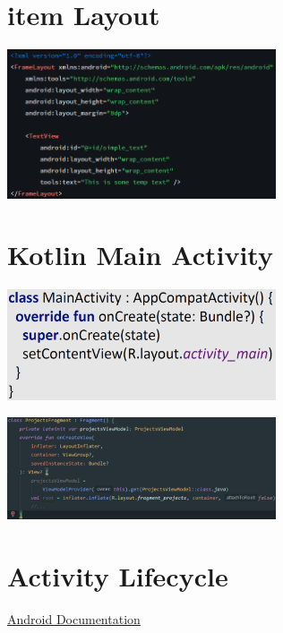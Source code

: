 \documentclass{report}
\newenvironment{Figure}
	{\par\medskip\noindent\minipage{\linewidth}}
	{\endminipage\par\medskip}
\theoremstyle{definition}
\theoremstyle{example}
\begin{document}
\section{item Layout}
\begin{Figure}
   \centering
    \includegraphics[width=300px]{img/itemLayout.png}
        \label{fig:Code Snippet Main Activity itemLayout}
\end{Figure}

\section{Kotlin Main Activity}
\begin{Figure}
   \centering
    \includegraphics[width=300px]{img/KotlinMainActivity.png}
        \label{fig:Code Snippet Main Activity in Kotlin}
\end{Figure}

\begin{Figure}
   \centering
    \includegraphics[width=300px]{img/layoutInflater.png}
        \label{fig:Code Snippet Using LayoutInflater to set view for fragment}
\end{Figure}


\section{Activity Lifecycle}
\href{https://developer.android.com/guide/components/activities/activity-lifecycle#kotlin}{Android Documentation}
\end{document}
